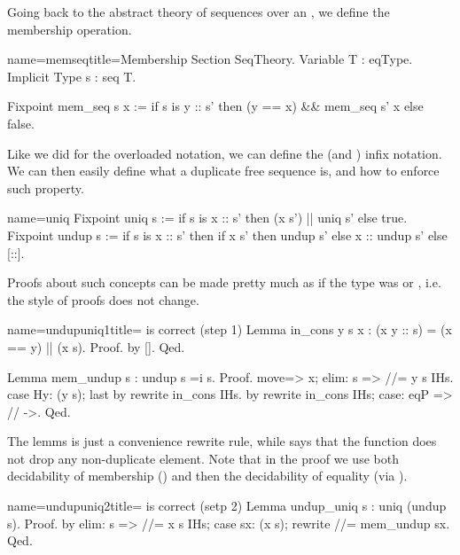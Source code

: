 Going back to the abstract theory of sequences over an ,
we define the membership operation.

\begin{coq}{name=memseq}{title=Membership}
Section SeqTheory.
Variable T : eqType.
Implicit Type s : seq T.

Fixpoint mem_seq s x :=
  if s is y :: s' then (y == x) && mem_seq s' x else false.
\end{coq}

Like we did for the overloaded \C{==} notation, we can define the
\C{\\in} (and \C{\\notin}) infix notation.  We can then easily
define what a duplicate free sequence is, and how to enforce such
property.

\begin{coq}{name=uniq}{}
Fixpoint uniq s :=
  if s is x :: s' then (x \notin s') || uniq s' else true.
Fixpoint undup s :=
  if s is x :: s' then
    if x \in s' then undup s' else x :: undup s'
  else [::].
\end{coq}

Proofs about such concepts can be made pretty much as if
the type  was  or , i.e. the style of proofs
does not change.

\begin{coq}{name=undupuniq1}{title= is correct (step 1)}
Lemma in_cons y s x : (x \in y :: s) = (x == y) || (x \in s).
Proof. by []. Qed.

Lemma mem_undup s : undup s =i s.
Proof.
move=> x; elim: s => //= y s IHs.
case Hy: (y \in s); last by rewrite in_cons IHs.
by rewrite in_cons IHs; case: eqP => // ->.
Qed.
\end{coq}

The  lemms is just a convenience rewrite rule, while
 says that the  function does not drop
any non-duplicate element.  Note that in the proof we use both
decidability of membership () and then the decidability of
equality (via ).

\begin{coq}{name=undupuniq2}{title= is correct (setp 2)}
Lemma undup_uniq s : uniq (undup s).
Proof.
by elim: s => //= x s IHs; case sx: (x \in s); rewrite //= mem_undup sx.
Qed.
\end{coq}

